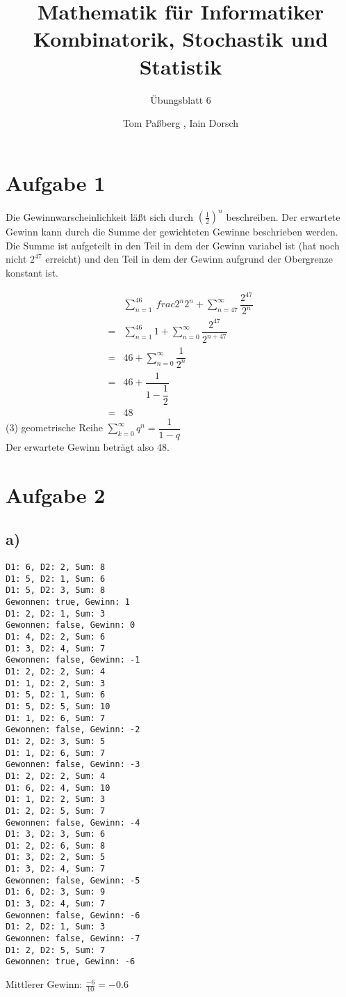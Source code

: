 \documentclass[a4paper]{scrartcl}
\title{Mathematik für Informatiker \\ Kombinatorik, Stochastik und Statistik}
\subtitle{Übungsblatt 6}
\author{Tom Paßberg , Iain Dorsch}
\date{}
\begin{document}
\maketitle
\newpage

\section*{Aufgabe 1}
Die Gewinnwarscheinlichkeit läßt sich durch $(\frac{1}{2})^n$ beschreiben. Der erwartete Gewinn kann durch die Summe der gewichteten Gewinne beschrieben werden.
Die Summe ist aufgeteilt in den Teil in dem der Gewinn variabel ist (hat noch nicht $2^{47}$ erreicht) und den Teil in dem der Gewinn aufgrund der Obergrenze konstant ist.

\begin{align}
	&\sum_{n=1}^{46} \	frac{2^n}{2^n} + \sum_{n=47}^{\infty} \dfrac{2^{47}}{2^n}\\
	= &\sum_{n=1}^{46} 1 + \sum_{n=0}^{\infty} \dfrac{2^{47}}{2^{n+47}}\\
	= &46 + \sum_{n=0}^{\infty} \dfrac{1}{2^n}\\
	= &46 + \dfrac{1}{1-\dfrac{1}{2}}\\
	= &48
\end{align}
(3) geometrische Reihe $\sum_{k=0}^{\infty} q^n = \dfrac{1}{1-q}$\\[12pt]
Der erwartete Gewinn beträgt also 48.\\
\section*{Aufgabe 2}
\subsection*{a)}
\begin{verbatim}
D1: 6, D2: 2, Sum: 8
D1: 5, D2: 1, Sum: 6
D1: 5, D2: 3, Sum: 8
Gewonnen: true, Gewinn: 1
D1: 2, D2: 1, Sum: 3
Gewonnen: false, Gewinn: 0
D1: 4, D2: 2, Sum: 6
D1: 3, D2: 4, Sum: 7
Gewonnen: false, Gewinn: -1
D1: 2, D2: 2, Sum: 4
D1: 1, D2: 2, Sum: 3
D1: 5, D2: 1, Sum: 6
D1: 5, D2: 5, Sum: 10
D1: 1, D2: 6, Sum: 7
Gewonnen: false, Gewinn: -2
D1: 2, D2: 3, Sum: 5
D1: 1, D2: 6, Sum: 7
Gewonnen: false, Gewinn: -3
D1: 2, D2: 2, Sum: 4
D1: 6, D2: 4, Sum: 10
D1: 1, D2: 2, Sum: 3
D1: 2, D2: 5, Sum: 7
Gewonnen: false, Gewinn: -4
D1: 3, D2: 3, Sum: 6
D1: 2, D2: 6, Sum: 8
D1: 3, D2: 2, Sum: 5
D1: 3, D2: 4, Sum: 7
Gewonnen: false, Gewinn: -5
D1: 6, D2: 3, Sum: 9
D1: 3, D2: 4, Sum: 7
Gewonnen: false, Gewinn: -6
D1: 2, D2: 1, Sum: 3
Gewonnen: false, Gewinn: -7
D1: 2, D2: 5, Sum: 7
Gewonnen: true, Gewinn: -6
\end{verbatim}
Mittlerer Gewinn: $ \frac{-6}{10} = -0.6$
\newpage
\end{document}

